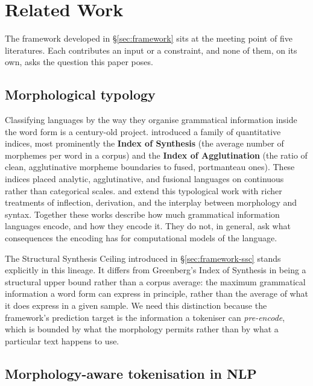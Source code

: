 \section{Related Work}
\label{sec:related}

The framework developed in \S\ref{sec:framework} sits at the meeting point of five literatures. Each contributes an input or a constraint, and none of them, on its own, asks the question this paper poses.

\subsection{Morphological typology}
\label{sec:related-typology}

Classifying languages by the way they organise grammatical information inside the word form is a century-old project. \citet{greenberg1960} introduced a family of quantitative indices, most prominently the \textbf{Index of Synthesis} (the average number of morphemes per word in a corpus) and the \textbf{Index of Agglutination} (the ratio of clean, agglutinative morpheme boundaries to fused, portmanteau ones). These indices placed analytic, agglutinative, and fusional languages on continuous rather than categorical scales. \citet{comrie1989} and \citet{haspelmath2010} extend this typological work with richer treatments of inflection, derivation, and the interplay between morphology and syntax. Together these works describe how much grammatical information languages encode, and how they encode it. They do not, in general, ask what consequences the encoding has for computational models of the language.

The Structural Synthesis Ceiling introduced in \S\ref{sec:framework-ssc} stands explicitly in this lineage. It differs from Greenberg's Index of Synthesis in being a structural upper bound rather than a corpus average: the maximum grammatical information a word form can express in principle, rather than the average of what it does express in a given sample. We need this distinction because the framework's prediction target is the information a tokeniser can \emph{pre-encode}, which is bounded by what the morphology permits rather than by what a particular text happens to use.

\subsection{Morphology-aware tokenisation in NLP}
\label{sec:related-tokenisation}

